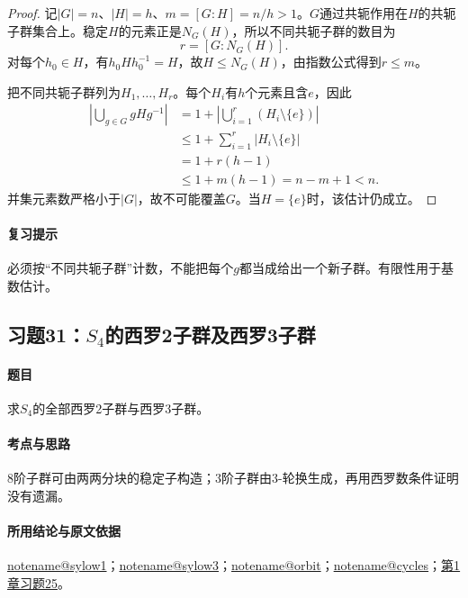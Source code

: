 \documentclass[UTF8,a4paper,11pt,fontset=windows]{ctexart}
\makeatletter
\newcommand{\noteref}[1]{\hyperref[note:#1]{\csname notename@#1\endcsname}}
\newcommand{\exref}[2]{\hyperref[ex:#1:#2]{第#1章习题#2}}
\makeatother
\begin{document}

\begin{proof}
记$|G|=n$、$|H|=h$、$m=[G:H]=n/h>1$。$G$通过共轭作用在$H$的共轭子群集合上。稳定$H$的元素正是$N_G(H)$，所以不同共轭子群的数目为
\[
r=[G:N_G(H)].
\]
对每个$h_0\in H$，有$h_0Hh_0^{-1}=H$，故$H\le N_G(H)$，由指数公式得到$r\le m$。

把不同共轭子群列为$H_1,\ldots,H_r$。每个$H_i$有$h$个元素且含$e$，因此
\begin{align*}
\left|\bigcup_{g\in G}gHg^{-1}\right|
&=1+\left|\bigcup_{i=1}^r(H_i\setminus\{e\})\right|\\
&\le1+\sum_{i=1}^r|H_i\setminus\{e\}|\\
&=1+r(h-1)\\
&\le1+m(h-1)=n-m+1<n.
\end{align*}
并集元素数严格小于$|G|$，故不可能覆盖$G$。当$H=\{e\}$时，该估计仍成立。
\end{proof}

\paragraph{复习提示}
必须按“不同共轭子群”计数，不能把每个$g$都当成给出一个新子群。有限性用于基数估计。


\subsection{习题31：\texorpdfstring{$S_4$的西罗2子群及西罗3子群}{S4的西罗2子群及西罗3子群}}
\label{ex:2:31}

\paragraph{题目}
求$S_4$的全部西罗2子群与西罗3子群。

\paragraph{考点与思路}
8阶子群可由两两分块的稳定子构造；3阶子群由3-轮换生成，再用西罗数条件证明没有遗漏。

\paragraph{所用结论与原文依据}
\noteref{sylow1}；\noteref{sylow3}；\noteref{orbit}；\noteref{cycles}；\exref{1}{25}。

\end{document}
